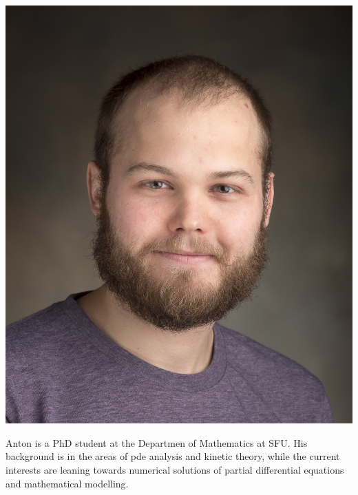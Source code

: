 \documentclass{beamer}
\begin{document}
\begin{frame}
\vspace{10pt}
\begin{minipage}[b]{0.15\textwidth}
\includegraphics[width=\textwidth, trim={70pt 170pt 70pt 100pt}, clip]{TeamPics/anton.jpg}
\end{minipage}\hspace{0.05\textwidth}%
\begin{minipage}[b]{0.8\textwidth}
{\small Anton is a PhD student at the Departmen of Mathematics at SFU. His background is in the areas of pde analysis and kinetic theory, while the current interests are leaning towards numerical solutions of partial differential equations and mathematical modelling. }
\end{minipage}

\end{frame}
\end{document}
